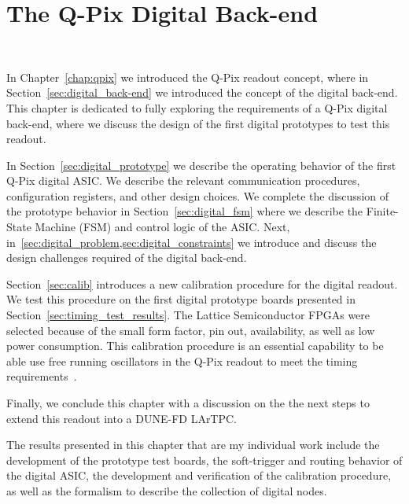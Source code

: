 \chapter{The Q-Pix Digital Back-end}~\label{chap:qdb}

In Chapter~\ref{chap:qpix} we introduced the Q-Pix readout concept, where in Section~\ref{sec:digital_back-end} we introduced the concept of the digital back-end.
This chapter is dedicated to fully exploring the requirements of a Q-Pix digital back-end, where we discuss the design of the first digital prototypes to test this readout.

In Section~\ref{sec:digital_prototype} we describe the operating behavior of the first Q-Pix digital ASIC.
We describe the relevant communication procedures, configuration registers, and other design choices.
We complete the discussion of the prototype behavior in Section~\ref{sec:digital_fsm} where we describe the Finite-State Machine (FSM) and control logic of the ASIC.
Next, in~\cref{sec:digital_problem,sec:digital_constraints} we introduce and discuss the design challenges required of the digital back-end.

Section~\ref{sec:calib} introduces a new calibration procedure for the digital readout.
We test this procedure on the first digital prototype boards presented in Section~\ref{sec:timing_test_results}.
The Lattice Semiconductor FPGAs \citep{lattice_ice40up_datasheet} were selected because of the small form factor, pin out, availability, as well as low power consumption.
This calibration procedure is an essential capability to be able use free running oscillators in the Q-Pix readout to meet the timing requirements~\citep{qpix:nygren:mei}.

Finally, we conclude this chapter with a discussion on the the next steps to extend this readout into a DUNE-FD LArTPC.

The results presented in this chapter that are my individual work include the development of the prototype test boards, the soft-trigger and routing behavior of the digital ASIC, the development and verification of the calibration procedure, as well as the formalism to describe the collection of digital nodes.



